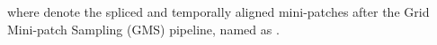 \documentclass[runningheads]{llncs}
\begin{document}
where  denote the spliced and temporally aligned mini-patches after the Grid Mini-patch Sampling (GMS) pipeline, named as \frag.
\begin{comment}
\subsection{Grid Mini-patch Sampling (GMS)}\label{section:fragment}

To well preserve the original video quality after sampling, we follow several important principles when designing the sampling process for \frag. We will illustrate the process along with these principles below.

\paragraph{Preserving local quality: retaining original resolution.} Most common distortion types in natural VQA, such as motion blurs, defocus blurs, noises and compression artifacts, are closely related to local textural information. These quality-related textures are highly localized and would be corrupted by resizing or discontinuous sampling, as discussed by several existing works~\cite{tlvqm,videval}. Therefore, we sample patches directly from the original resolution frames without any resizing operations to preserve the local quality information.

\paragraph{Preserving global quality: grid partition and patch sampling.} Besides retaining local quality, the uniformity of sampling also affects the accuracy of the global quality prediction as the quality of local areas may differ from the overall video. For instance, if we only sample patches from the dark areas (with lower perceptual quality) in the frames shown in Fig.~\ref{fig:4}, the predictions will be lower than the ground truth quality of the video. To keep the uniformity of sampling, we design the grid partition (Fig.~\ref{fig:4}(a), Eq.~\ref{eq:1}) to cut video frames into  uniform grids (), and random patch sampling (, Fig.~\ref{fig:4}(b), Eq.~\ref{eq:2}) to uniformly sample mini-patches () with size  from , as shown in Fig.~\ref{fig:4}.






\paragraph{Preserving contextual relations: patch splicing.} Many existing works (\cite{sfa,vsfa,mlsp}) have shown that contextual relations and global scene information affects the quality judgements, for instance, the clear skies and the blurry areas might share similar textures but with obviously different quality. We preserve these contextual relations by splicing the mini-patches together in the original positions of their corresponding grids via patch splicing (Fig.~\ref{fig:4}(c), Eq.~\ref{eq:3}).






\end{comment}
\end{document}
